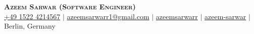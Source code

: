 

\begin{center}
    \textbf{\Huge \scshape Azeem Sarwar \small (Software Engineer)} \\ \vspace{3pt}
    \small
    \faMobile \hspace{.5pt} \href{tel:004915224214567}{+49 1522 4214567}
    $|$
    \faAt \hspace{.5pt} \href{mailto:azeemsarwarr1@gmail.com}{azeemsarwarr1@gmail.com}
    $|$
    \faLinkedinSquare \hspace{.5pt} \href{https://www.linkedin.com/in/azeemsarwarr}{azeemsarwarr}
    $|$
    \faGithub \hspace{.5pt} \href{https://github.com/azeem-sarwar}{azeem-sarwar}
    $|$
    \faMapMarker \hspace{.5pt} {Berlin, Germany}
\end{center}